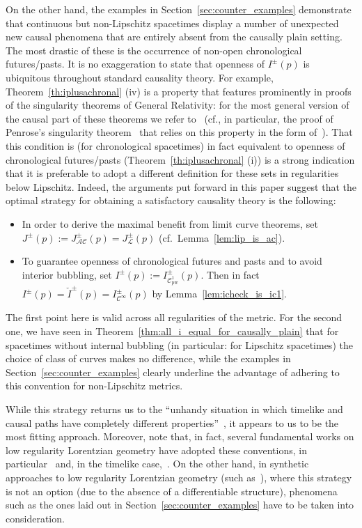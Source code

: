 \documentclass[reqno]{amsart}
\numberwithin{equation}{section}
\theoremstyle{plain}
\theoremstyle{definition}
\theoremstyle{remark}
\newcommand{\copw}{\mathcal{C}^1_{\mathrm{pw}}}
\newcommand{\cinfty}{\mathcal{C}^\infty}
\begin{document}
On the other hand, the examples in Section~\ref{sec:counter_examples} demonstrate that continuous but non-Lipschitz spacetimes
display a number of unexpected new causal phenomena that are entirely absent from the causally plain setting.
The most drastic of these is the occurrence of non-open chronological futures/pasts. It is no exaggeration to
state that openness of $I^\pm(p)$ is ubiquitous throughout standard causality theory. For example, Theorem~\ref{th:iplusachronal} (iv) is a property that features prominently in proofs of the singularity theorems of
General Relativity: for the most general version of the causal part of these theorems we refer to~\cite[Sec.\ 2.15]{Min:19} (cf., in particular, the proof of Penrose's singularity theorem~\cite[Thm.\ 65]{Min:19}
that relies on this property in the form of~\cite[Thm.\ 20]{Min:19}). That this condition is (for chronological spacetimes) in fact equivalent to openness of chronological futures/pasts (Theorem~\ref{th:iplusachronal} (i)) 
is a strong indication that it is preferable to adopt a different definition for these sets in regularities below Lipschitz.
Indeed, the arguments put forward in this paper suggest that the optimal strategy for obtaining a
satisfactory causality theory is the following:
\begin{itemize}[itemsep=2mm]
\item In order to derive the maximal benefit from limit curve theorems, set $J^\pm(p):=J^\pm_{\mathcal{AC}}(p) = 
J^\pm_{\mathcal{L}}(p)$ (cf.\ Lemma~\ref{lem:lip_is_ac}).
\item To guarantee openness of chronological futures and pasts and to avoid interior bubbling, 
set $I^\pm(p):=I^\pm_{\copw}(p)$. Then in fact $I^\pm(p)=\check I^\pm(p) = I^\pm_{\cinfty}(p)$
by Lemma~\ref{lem:icheck_is_ic1}.
\end{itemize} 
The first point here is valid across all regularities of the metric. For the second one,
we have seen in Theorem~\ref{thm:all_i_equal_for_causally_plain} that for spacetimes without internal bubbling (in 
particular: for Lipschitz spacetimes) the choice of class of curves 
makes no difference, while the examples in Section~\ref{sec:counter_examples} clearly 
underline the advantage of adhering to this convention for non-Lipschitz metrics. 

While this strategy returns us to the ``unhandy situation in which timelike and causal paths have completely different
properties''~\cite[p.\ 14]{Chr:11}, it appears to us to be the most fitting approach. Moreover, note that, in fact, several fundamental
works on low regularity Lorentzian geometry have adopted these conventions, in particular~\cite{Min:15,Min:19, BS:18} and, in the timelike case,~\cite{GL:17,Sbi:18}. 
On the other hand, in synthetic approaches to low regularity Lorentzian geometry (such as~\cite{KS:18,GKS:18}), where
this strategy is not an option (due to the absence of a differentiable structure), 
phenomena such as the ones laid out in Section~\ref{sec:counter_examples} have to be taken into consideration.
\end{document}
